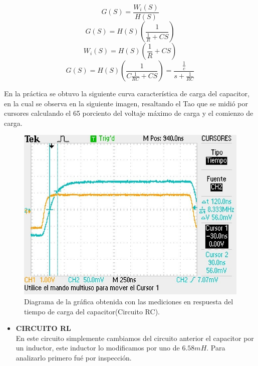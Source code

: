 \documentclass[letterpaper,10pt]{article}
\begin{document}
    \begin{equation}    
    G(S) = \frac{W_i(S)}{H(S)}
    \end{equation}
    \begin{equation}
    G(S) = H(S)(\frac{1}{\frac{1}{R} + CS})
    \end{equation}
	\begin{equation}
	W_i(S) = H(S)(\frac{1}{R} + CS)
	\end{equation}
	 \begin{equation}
	G(S) = H(S)(\frac{1}{C\frac{1}{RC} + CS}) = \frac{\frac{1}{c}}{s+\frac{1}{RC}}
	\end{equation}
    
    En la práctica se obtuvo la siguiente curva característica de carga del capacitor, en la cual se observa en la siguiente imagen, resaltando el Tao que se midió por cursores calculando el 65 porciento del voltaje máximo de carga y el comienzo de carga.
    \vspace*{0.2in}
    \begin{figure}[h!]
    	\centering
    	\includegraphics[scale=1.5]{TAOCAP}
    	\caption{Diagrama de la gráfica obtenida con las mediciones en respuesta del tiempo de carga del capacitor(Circuito RC).}
    \end{figure}
    \begin{itemize}
    	\item
    	\textbf{CIRCUITO RL}\vspace*{0.4in}\\
    	En este circuito simplemente cambiamos del circuito anterior el capacitor por un inductor, este inductor lo modificamos por uno de $6.58 mH$.
    	Para analizarlo primero fué por inspección.
    	\end{itemize}
    
\end{document}
